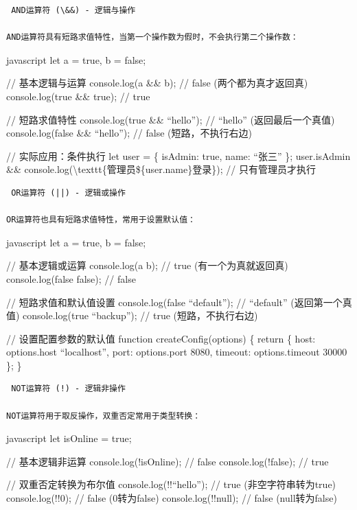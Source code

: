 \begin{lstlisting}
 AND运算符 (\&&) - 逻辑与操作

AND运算符具有短路求值特性，当第一个操作数为假时，不会执行第二个操作数：
\end{lstlisting}

javascript let a = true, b = false;

// 基本逻辑与运算 console.log(a \&\& b); // false (两个都为真才返回真) console.log(true \&\& true); // true

// 短路求值特性 console.log(true \&\& ``hello''); // ``hello'' (返回最后一个真值) console.log(false \&\& ``hello''); // false (短路，不执行右边)

// 实际应用：条件执行 let user = \{ isAdmin: true, name: ``张三'' \}; user.isAdmin \&\& console.log(\textbackslash texttt\{管理员\$\{user.name\}登录\}); // 只有管理员才执行

\begin{lstlisting}
 OR运算符 (||) - 逻辑或操作  

OR运算符也具有短路求值特性，常用于设置默认值：
\end{lstlisting}

javascript let a = true, b = false;

// 基本逻辑或运算 console.log(a \textbar\textbar{} b); // true (有一个为真就返回真) console.log(false \textbar\textbar{} false); // false

// 短路求值和默认值设置 console.log(false \textbar\textbar{} ``default''); // ``default'' (返回第一个真值) console.log(true \textbar\textbar{} ``backup''); // true (短路，不执行右边)

// 设置配置参数的默认值 function createConfig(options) \{ return \{ host: options.host \textbar\textbar{} ``localhost'', port: options.port \textbar\textbar{} 8080, timeout: options.timeout \textbar\textbar{} 30000 \}; \}

\begin{lstlisting}
 NOT运算符 (!) - 逻辑非操作

NOT运算符用于取反操作，双重否定常用于类型转换：
\end{lstlisting}

javascript let isOnline = true;

// 基本逻辑非运算 console.log(!isOnline); // false console.log(!false); // true

// 双重否定转换为布尔值 console.log(!!``hello''); // true (非空字符串转为true) console.log(!!0); // false (0转为false) console.log(!!null); // false (null转为false)

